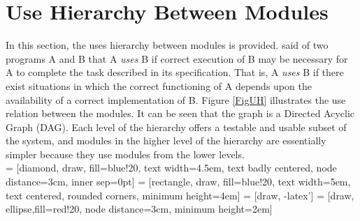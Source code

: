 \documentclass[12pt, titlepage]{article}
\begin{document}
	\section{Use Hierarchy Between Modules} \label{SecUse}
	
	In this section, the uses hierarchy between modules is
	provided. \citet{Parnas1978} said of two programs A and B that A {\em uses} 
	B if
	correct execution of B may be necessary for A to complete the task 
	described in
	its specification. That is, A {\em uses} B if there exist situations in 
	which
	the correct functioning of A depends upon the availability of a correct
	implementation of B.  Figure \ref{FigUH} illustrates the use relation 
	between
	the modules. It can be seen that the graph is a Directed Acyclic Graph
	(DAG). Each level of the hierarchy offers a testable and usable subset of 
	the
	system, and modules in the higher level of the hierarchy are essentially 
	simpler
	because they use modules from the lower levels. \\
	
	
	
	 = [diamond, draw, fill=blue!20, 
	text width=4.5em, text badly centered, node distance=3cm, inner sep=0pt]
	 = [rectangle, draw, fill=blue!20, 
	text width=5em, text centered, rounded corners, minimum height=4em]
	 = [draw, -latex']
	 = [draw, ellipse,fill=red!20, node distance=3cm,
	minimum height=2em] 
	
\end{document}
